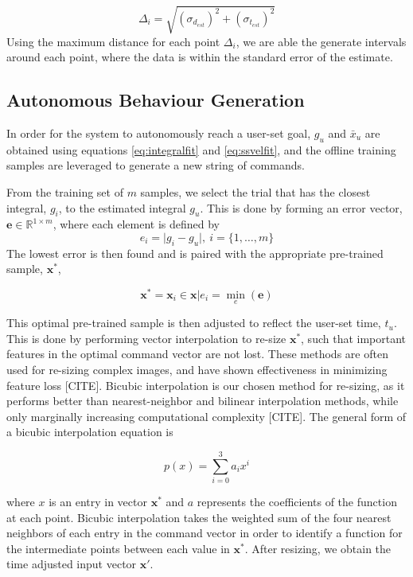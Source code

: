\documentclass[letterpaper, 10 pt, conference]{ieeeconf}  %
\newcommand{\R}{\mathbb{R}}
\begin{document}
\begin{equation}
    \Delta_i = \sqrt{(\sigma_{d_{est}})^2+(\sigma_{t_{est}})^2}
\end{equation}
Using the maximum distance for each point $\Delta_i$, we are able the generate intervals around each point, where the data is within the standard error of the estimate.


\subsection{Autonomous Behaviour Generation}

In order for the system to autonomously reach a user-set goal, $g_u$ and $\bar{x}_u$ are obtained using equations \eqref{eq:integralfit} and \eqref{eq:ssvelfit}, and the offline training samples are leveraged to generate a new string of commands.

From the training set of $m$ samples, we select the trial that has the closest integral, $g_i$, to the estimated integral $g_u$. This is done by forming an error vector, $\mathbf{e}\in\R^{1\times m}$, where each element is defined by
\begin{equation}
 e_i = \vert g_i-g_u \vert , ~i= \{1,\ldots,m\}
\end{equation}
 The lowest error is then found and is paired with the appropriate pre-trained sample, $\mathbf{x}^*$,

\begin{equation}
\mathbf{x}^* = \mathbf{x}_i \in \mathbf{x}\vert e_i = \min_e(\mathbf{e})
\end{equation}

This optimal pre-trained sample is then adjusted to reflect the user-set time, $t_u$. This is done by performing vector interpolation to re-size $\mathbf{x}^*$, such that important features in the optimal command vector are not lost. These methods are often used for re-sizing complex images, and have shown effectiveness in minimizing feature loss [CITE]. Bicubic interpolation is our chosen method for re-sizing, as it performs better than nearest-neighbor and bilinear interpolation methods, while only marginally increasing computational complexity [CITE]. The general form of a bicubic interpolation equation is 

\begin{equation} \label{eq:bicinter}
    p(x) = \sum_{i=0}^3a_ix^i
\end{equation}

where $x$ is an entry in vector $\mathbf{x}^*$ and $a$ represents the coefficients of the function at each point. Bicubic interpolation takes the weighted sum of the four nearest neighbors of each entry in the command vector in order to identify a function for the intermediate points between each value in $\mathbf{x}^*$. After resizing, we obtain the time adjusted input vector $\mathbf{x}'$.
\end{document}
